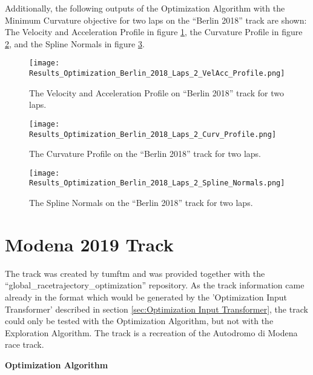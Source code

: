 Additionally, the following outputs of the Optimization Algorithm with the Minimum Curvature objective for two laps on the ``Berlin 2018'' track are shown: The Velocity and Acceleration Profile in figure \ref{fig:Results Berlin 2018 Laps 2 VelAcc Profile}, the Curvature Profile in figure \ref{fig:Results Berlin 2018 Laps 2 Curv Profile}, and the Spline Normals in figure \ref{fig:Results Berlin 2018 Laps 2 Spline Normals}.
\begin{figure}[H]
    \centering
    \texttt{[image: Results\_Optimization\_Berlin\_2018\_Laps\_2\_VelAcc\_Profile.png]}
    \caption{The Velocity and Acceleration Profile on ``Berlin 2018'' track for two laps.}
    \label{fig:Results Berlin 2018 Laps 2 VelAcc Profile}
\end{figure}
\begin{figure}[H]
    \centering
    \texttt{[image: Results\_Optimization\_Berlin\_2018\_Laps\_2\_Curv\_Profile.png]}
    \caption{The Curvature Profile on the ``Berlin 2018'' track for two laps.}
    \label{fig:Results Berlin 2018 Laps 2 Curv Profile}
\end{figure}
\begin{figure}[H]
    \centering
    \texttt{[image: Results\_Optimization\_Berlin\_2018\_Laps\_2\_Spline\_Normals.png]}
    \caption{The Spline Normals on the ``Berlin 2018'' track for two laps.}
    \label{fig:Results Berlin 2018 Laps 2 Spline Normals}
\end{figure}

\pagebreak

\section{Modena 2019 Track} \label{sec:Results Modena 2019 Track}
The track was created by \acrshort{tumftm} and was provided together with the ``global\_racetrajectory\_optimization'' repository. \cite{tumftm_optimization_algoritm}
As the track information came already in the format which would be generated by the 'Optimization Input Transformer' described in section \ref{sec:Optimization Input Transformer}, the track could only be tested with the Optimization Algorithm, but not with the Exploration Algorithm. The track is a recreation of the Autodromo di Modena race track. \cite{modena_race_track}

\textbf{Optimization Algorithm}

